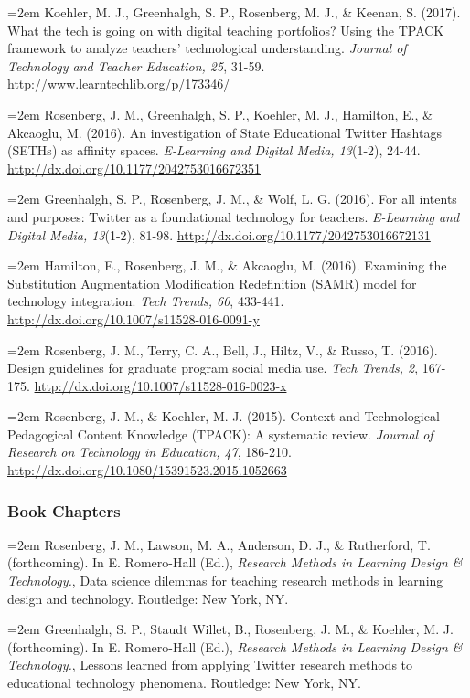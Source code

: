 \documentclass[14,]{article}
\begin{document}
\hangindent=2em Koehler, M. J., Greenhalgh, S. P., Rosenberg, M. J., \&
Keenan, S. (2017). What the tech is going on with digital teaching
portfolios? Using the TPACK framework to analyze teachers' technological
understanding. \emph{Journal of Technology and Teacher Education, 25},
31-59. \url{http://www.learntechlib.org/p/173346/}

\hangindent=2em Rosenberg, J. M., Greenhalgh, S. P., Koehler, M. J.,
Hamilton, E., \& Akcaoglu, M. (2016). An investigation of State
Educational Twitter Hashtags (SETHs) as affinity spaces.
\emph{E-Learning and Digital Media, 13}(1-2), 24-44.
\url{http://dx.doi.org/10.1177/2042753016672351}

\hangindent=2em Greenhalgh, S. P., Rosenberg, J. M., \& Wolf, L. G.
(2016). For all intents and purposes: Twitter as a foundational
technology for teachers. \emph{E-Learning and Digital Media, 13}(1-2),
81-98. \url{http://dx.doi.org/10.1177/2042753016672131}

\hangindent=2em Hamilton, E., Rosenberg, J. M., \& Akcaoglu, M. (2016).
Examining the Substitution Augmentation Modification Redefinition (SAMR)
model for technology integration. \emph{Tech Trends, 60}, 433-441.
\url{http://dx.doi.org/10.1007/s11528-016-0091-y}

\hangindent=2em Rosenberg, J. M., Terry, C. A., Bell, J., Hiltz, V., \&
Russo, T. (2016). Design guidelines for graduate program social media
use. \emph{Tech Trends, 2}, 167-175.
\url{http://dx.doi.org/10.1007/s11528-016-0023-x}

\hangindent=2em Rosenberg, J. M., \& Koehler, M. J. (2015). Context and
Technological Pedagogical Content Knowledge (TPACK): A systematic
review. \emph{Journal of Research on Technology in Education, 47},
186-210. \url{http://dx.doi.org/10.1080/15391523.2015.1052663}

\hypertarget{book-chapters}{%
\subsubsection{Book Chapters}\label{book-chapters}}

\hangindent=2em Rosenberg, J. M., Lawson, M. A., Anderson, D. J., \&
Rutherford, T. (forthcoming). In E. Romero-Hall (Ed.), \emph{Research
Methods in Learning Design \& Technology.}, Data science dilemmas for
teaching research methods in learning design and technology. Routledge:
New York, NY.

\hangindent=2em Greenhalgh, S. P., Staudt Willet, B., Rosenberg, J. M.,
\& Koehler, M. J. (forthcoming). In E. Romero-Hall (Ed.), \emph{Research
Methods in Learning Design \& Technology.}, Lessons learned from
applying Twitter research methods to educational technology phenomena.
Routledge: New York, NY.
\end{document}
